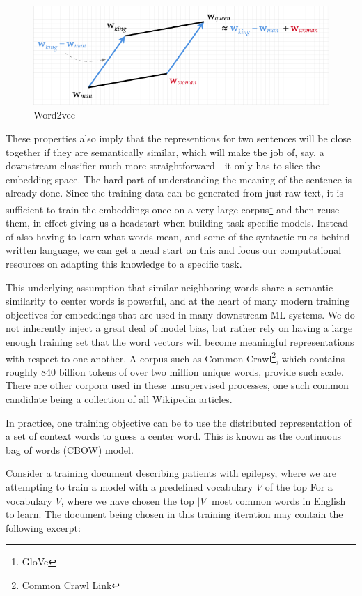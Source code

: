 \begin{figure}
  \includegraphics[width=\linewidth]{chapters/NLP/figures/king-man+woman.png}
  \caption{Word2vec}
  \label{fig:kingmanwoman}
\end{figure}
These properties also imply that the representions for two sentences will be close together if they are semantically similar, which will make the job of, say, a downstream classifier much more straightforward - it only has to slice the embedding space.
The hard part of understanding the meaning of the sentence is already done.
Since the training data can be generated from just raw text, it is sufficient to train the embeddings once on a very large corpus\footnote{GloVe} and then reuse them, in effect giving us a headstart when building task-specific models.
Instead of also having to learn what words mean, and some of the syntactic rules behind written language, we can get a head start on this and focus our computational resources on adapting this knowledge to a specific task.

This underlying assumption that similar neighboring words share a semantic similarity to center words is powerful, and at the heart of many modern training objectives for embeddings that are used in many downstream ML systems.
We do not inherently inject a great deal of model bias, but rather rely on having a large enough training set that the word vectors will become meaningful representations with respect to one another.
A corpus such as Common Crawl\footnote{Common Crawl Link}, which contains roughly 840 billion tokens of over two million unique words, provide such scale.
There are other corpora used in these unsupervised processes, one such common candidate being a collection of all Wikipedia articles.

In practice, one training objective can be to use the distributed representation of a set of context words to guess a center word. This is known as the continuous bag of words (CBOW) model.

Consider a training document describing patients with epilepsy, where we are attempting to train a model with a predefined vocabulary $V$ of the top For a vocabulary $V$, where we have chosen the top $|V|$ most common words in English to learn.
The document being chosen in this training iteration may contain the following excerpt:

